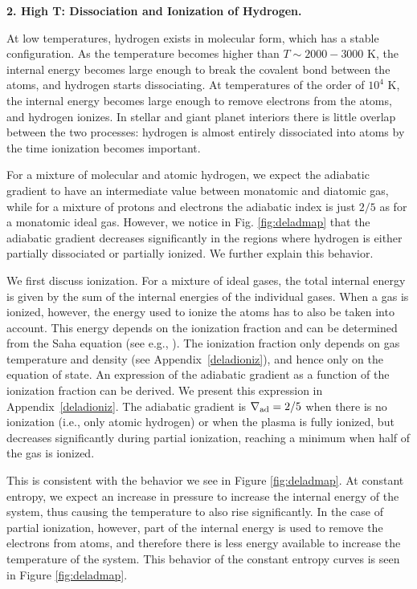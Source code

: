 \documentclass[apj]{emulateapj}
\newcommand{\delad}{\nabla_{\rm ad}}
\newcommand{\App}[1]{Appendix~\ref{#1}}
\begin{document}
\vspace{0.2in}

\textbf{2. High T: Dissociation and Ionization of Hydrogen.}

At low temperatures, hydrogen exists in molecular form, which has a stable configuration. As the temperature becomes higher than $T \sim 2000-3000$ K, the internal energy becomes large enough to break the covalent bond between the atoms, and hydrogen starts dissociating. At temperatures of the order of $10^4$ K, the internal energy becomes large enough to remove electrons from the atoms, and hydrogen ionizes. In stellar and giant planet interiors there is little overlap between the two processes: hydrogen is almost entirely dissociated into atoms by the time ionization becomes important. 

For a mixture of molecular and atomic hydrogen, we expect the adiabatic gradient to have an intermediate value between monatomic and diatomic gas, while for a mixture of protons and electrons the adiabatic index is just $2/5$ as for a monatomic ideal gas. However, we notice in Fig. \ref{fig:deladmap} that the adiabatic gradient decreases significantly in the regions where hydrogen is either partially dissociated or partially ionized. We further explain this behavior.

We first discuss ionization. For a mixture of ideal gases, the total internal energy is given by the sum of the internal energies of the individual gases. When a gas is ionized, however, the energy used to ionize the atoms has to also be taken into account. This energy depends on the ionization fraction and can be determined from the Saha equation (see e.g., \citealt{kippenhahn90}). The ionization fraction only depends on gas temperature and density (see \App{deladioniz}), and hence only on the equation of state. An expression of the adiabatic gradient as a function of the ionization fraction can be derived. We present this expression in \App{deladioniz}. The adiabatic gradient is $\delad=2/5$ when there is no ionization (i.e., only atomic hydrogen) or when the plasma is fully ionized, but decreases significantly during partial ionization, reaching a minimum when half of the gas is ionized. 

This is consistent with the behavior we see in Figure \ref{fig:deladmap}. At constant entropy, we expect an increase in pressure to increase the internal energy of the system, thus causing the temperature to also rise significantly. In the case of partial ionization, however, part of the internal energy is used to remove the electrons from atoms, and therefore there is less energy available to increase the temperature of the system. This behavior of the constant entropy curves is seen in Figure \ref{fig:deladmap}. 
\end{document}
